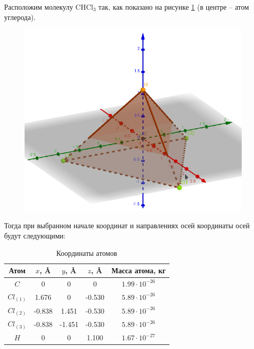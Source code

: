 Расположим молекулу CHCl$_3$ так, как показано на рисунке \ref{fig:mol} (в центре -- атом углерода). 

\begin{figure}
\centering
\includegraphics[width=0.7\linewidth]{mol}
\caption{}
\label{fig:mol}
\end{figure}

Тогда при выбранном начале координат и направлениях осей координаты осей будут следующими:
\begin{table}[h!]
	\centering
	\caption{Координаты атомов}
	\label{tab3}
	\setlength{\extrarowheight}{1mm}
	\begin{tabular}{|c|c|c|c|c|}
		\hline 
		Атом & $x$, \AA & $y$, \AA & $z$, \AA &  Масса атома, кг \\ 
		\hline 
		$C$ & 0 & 0 & 0 & $1.99\cdot10^{-26}$ \\ 
		\hline 
		$Cl_{(1)}$ & 1.676 & 0 & -0.530 & $5.89\cdot10^{-26}$ \\ 
		\hline 
		$Cl_{(2)}$ & -0.838 & 1.451 & -0.530 & $5.89\cdot10^{-26}$ \\ 
		\hline 
		$Cl_{(3)}$ & -0.838 & -1.451 & -0.530 & $5.89\cdot10^{-26}$ \\ 
		\hline 
		$H$ & 0 & 0 & 1.100 & $1.67\cdot10^{-27}$ \\ 
		\hline 
	\end{tabular} 
\end{table}

